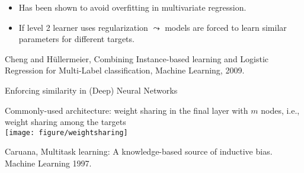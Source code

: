 \documentclass[11pt,compress,t,notes=noshow, xcolor=table]{beamer}
\begin{document}
\begin{frame}
\begin{itemize}
		\item Has been shown to avoid overfitting in multivariate regression.
        \vspace{5pt}
        
		\item If level 2 learner uses regularization $\leadsto$ models are forced to learn similar parameters for different targets.  
	\end{itemize}
	{\tiny Cheng and H\"ullermeier, Combining Instance-based learning and Logistic Regression for Multi-Label classification, Machine Learning, 2009.}
	
\end{frame}

\begin{frame}{Enforcing similarity in (Deep) Neural Networks}
	\small
	\begin{center}
		Commonly-used architecture: weight sharing in the final layer with $m$ nodes, i.e., weight sharing among the targets \\
		\vspace{0.2cm}
		\texttt{[image: figure/weightsharing]}
	\end{center}

{\tiny Caruana, Multitask learning: A knowledge-based source of inductive bias. Machine	Learning 1997.}
\end{frame}


%
\endlecture
\end{document}
